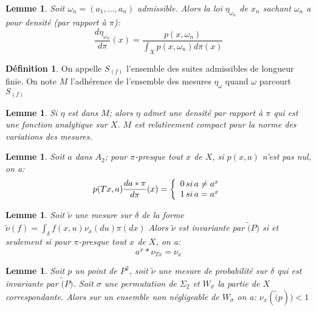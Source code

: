 \documentclass[12pt]{article}
\theoremstyle{plain}%
\newtheorem{lem}[thm]{Lemme}
\theoremstyle{definition}
\newtheorem{dfnt}{Définition}[section]
\theoremstyle{remark}
\begin{document}
\begin{lem}
Soit $\omega_n=(a_1,...,a_n)$ admissible. Alors la loi $\eta_{\omega_n}$ de $x_n$ sachant $\omega_n$ a pour densité (par rapport à $\pi$):$$
\frac{d \eta_{\omega_n}}{d \pi}(x)=\frac{p(x,\omega_n)}{\int_X p(x,\omega_n) d \pi (x)}
$$
\end{lem}
\begin{dfnt}
On appelle $S_(f)$ l'ensemble des suites admissibles de longueur finie. On note $M$ l'adhérence de l'ensemble des mesures $\eta_\omega$ quand $\omega$ parcourt $S_(f)$
\end{dfnt}

\begin{lem}
Si $\eta$ est dans $M$; alors $\eta$ admet une densité par rapport à $\pi$ qui est une fonction analytique sur $X$. $M$ est relativement compact pour la norme des variations des mesures.
\end{lem}

\begin{lem}
Soit $a$ dans $A_2$; pour $\pi$-presque tout $x$ de $X$, si $p(x,a)$ n'est pas nul, on a:$$
p(Tx,a)\frac{d a* \pi}{d \pi}(x)=
\left \{
\begin{array}{r c }
0 \, si \,  a \ne a^x \\
1 \, si \, a=a^x
\end{array}
\right .
$$
\end{lem}

\begin{lem}
Soit $\tilde{\nu}$ une mesure sur $\delta$ de la forme $\tilde{\nu}(f)=\int_\delta f(x,u)\nu_x(du)\pi(dx)$ Alors $\tilde{\nu}$ est invariante par $\tilde(P)$ si et seulement si pour $\pi$-presque tout $x$ de $X$, on a:$$
a^x*\nu_{Tx}=\nu_x
$$
\end{lem}

\begin{lem}
Soit $p$ un point de $P^2$, soit $\tilde{\nu}$ une mesure de probabilité sur $\delta$ qui est invariante par $\tilde(P)$. Soit $\sigma$ une permutation de $\Sigma_2$ et $W_\sigma$ la partie de $X$ correspondante. Alors sur un ensemble non négligeable de $W_\sigma$ on a: $\nu_x(\tilde(p))<1 $
\end{lem}
\end{document}
